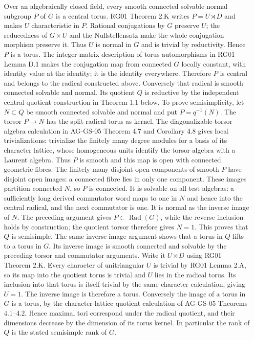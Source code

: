 \documentclass[11pt,a4paper,openany]{report}
\begin{document}
Over an algebraically closed field, every smooth connected solvable normal subgroup \(P\) of \(G\) is a central torus. RG01 Theorem 2.K writes \(P=U\rtimes D\) and makes \(U\) characteristic in \(P\). Rational conjugations by \(G\) preserve \(U\); the reducedness of \(G\times U\) and the Nullstellensatz make the whole conjugation morphism preserve it. Thus \(U\) is normal in \(G\) and is trivial by reductivity. Hence \(P\) is a torus. The integer-matrix description of torus automorphisms in RG01 Lemma D.1 makes the conjugation map from connected \(G\) locally constant, with identity value at the identity; it is the identity everywhere. Therefore \(P\) is central and belongs to the radical constructed above. Conversely that radical is smooth connected solvable and normal. Its quotient \(Q\) is reductive by the independent central-quotient construction in Theorem 1.1 below. To prove semisimplicity, let \(N\subset Q\) be smooth connected solvable and normal and put \(P=q^{-1}(N)\). The torsor \(P\to N\) has the split radical torus as kernel. The diagonalizable-torsor algebra calculation in AG-GS-05 Theorem 4.7 and Corollary 4.8 gives local trivializations: trivialize the finitely many degree modules for a basis of its character lattice, whose homogeneous units identify the torsor algebra with a Laurent algebra. Thus \(P\) is smooth and this map is open with connected geometric fibres. The finitely many disjoint open components of smooth \(P\) have disjoint open images: a connected fibre lies in only one component. These images partition connected \(N\), so \(P\) is connected. It is solvable on all test algebras: a sufficiently long derived commutator word maps to one in \(N\) and hence into the central radical, and the next commutator is one. It is normal as the inverse image of \(N\). The preceding argument gives \(P\subset\operatorname{Rad}(G)\), while the reverse inclusion holds by construction; the quotient torsor therefore gives \(N=1\). This proves that \(Q\) is semisimple. The same inverse-image argument shows that a torus in \(Q\) lifts to a torus in \(G\). Its inverse image is smooth connected and solvable by the preceding torsor and commutator arguments. Write it \(U\rtimes D\) using RG01 Theorem 2.K. Every character of unitriangular \(U\) is trivial by RG01 Lemma 2.A, so its map into the quotient torus is trivial and \(U\) lies in the radical torus. Its inclusion into that torus is itself trivial by the same character calculation, giving \(U=1\). The inverse image is therefore a torus. Conversely the image of a torus in \(G\) is a torus, by the character-lattice quotient calculation of AG-GS-05 Theorems 4.1--4.2. Hence maximal tori correspond under the radical quotient, and their dimensions decrease by the dimension of its torus kernel. In particular the rank of \(Q\) is the stated semisimple rank of \(G\).
\end{document}
